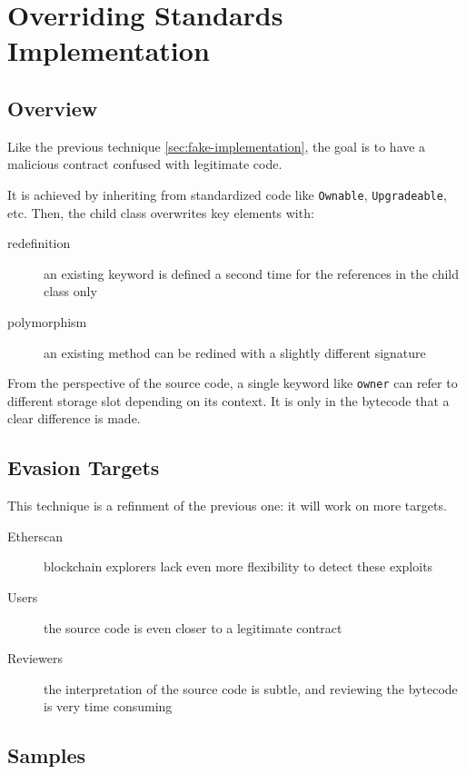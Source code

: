 \section{Overriding Standards Implementation}

\subsection{Overview}

Like the previous technique \ref{sec:fake-implementation}, the goal is to have a malicious contract confused with legitimate code.

It is achieved by inheriting from standardized code like \lstinline{Ownable}, \lstinline{Upgradeable}, etc.
Then, the child class overwrites key elements with:

\begin{description}
\item[redefinition]{an existing keyword is defined a second time for the references in the child class only}
\item[polymorphism]{an existing method can be redined with a slightly different signature}
\end{description}

From the perspective of the source code, a single keyword like \lstinline{owner} can refer to different storage slot depending on its context.
It is only in the bytecode that a clear difference is made.

\subsection{Evasion Targets}

This technique is a refinment of the previous one: it will work on more targets.

\begin{description}
\item[Etherscan]{blockchain explorers lack  even more flexibility to detect these exploits}
\item[Users]{the source code is even closer to a legitimate contract}
\item[Reviewers]{the interpretation of the source code is subtle, and reviewing the bytecode is very time consuming}
\end{description}

\subsection{Samples}

